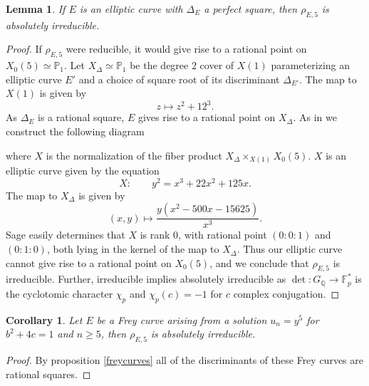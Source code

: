 \documentclass[12pt]{amsart}
\newtheorem{lem}[thm]{Lemma}
\newtheorem{cor}[thm]{Corollary}
\theoremstyle{definition}
\def\F{{\mathbb F}}
\def\P{{{\mathbb P}}}
\def\Q{{\mathbb Q}}
\begin{document}
\begin{lem}\label{5irr}
If $E$ is an elliptic curve with $\Delta_E$ a perfect square, then $\rho_{E,5} $ is absolutely irreducible.
\end{lem}
\begin{proof}
If $\rho_{E,5}$ were reducible, it would give rise to a rational point on $X_0(5) \simeq \P_1$.  Let $X_{\Delta} \simeq \P_1$ be the degree $2$ cover of $X(1)$ parameterizing an elliptic curve $E'$ and a choice of square root of its discriminant $\Delta_{E'}$.  The map to $X(1)$ is given by
\[z \mapsto z^2 + 12^3. \]
As $\Delta_E$ is a rational square, $E$ gives rise to a rational point on $X_{\Delta}$.
As in \cite{brown12} we construct the following diagram
\begin{center}
\end{center}
where $X$ is the normalization of the fiber product $X_{\Delta} \times_{X(1)} X_0(5)$.  $X$ is an elliptic curve given by the equation
\[X: \qquad  y^2 = x^3 + 22x^2 +125x .\]
The map to $X_{\Delta}$ is given by
\[ (x,y) \mapsto \frac{y(x^2-500x -15625)}{x^3}. \]
Sage easily determines that $X$ is rank $0$, with rational point $(0:0:1)$ and $(0:1:0)$, both lying in the kernel of the map to $X_{\Delta}$.  Thus our elliptic curve cannot give rise to a rational point on $X_0(5)$, and we conclude that $\rho_{E,5}$ is irreducible.  Further, irreducible implies absolutely irreducible as $\det: G_\Q \rightarrow \F_p^*$ is the cyclotomic character $\chi_p$ and $\chi_p(c)=-1$ for $c$ complex conjugation.
\end{proof}
\begin{cor}\label{frey5irr}
Let $E$ be a Frey curve arising from a solution $u_n = y^5$ for $b^2+4c = 1$ and $n\geq 5$, then $\rho_{E,5}$ is absolutely irreducible.
\end{cor}
\begin{proof}
By proposition \ref{freycurves} all of the discriminants of these Frey curves are rational squares.
\end{proof}
\end{document}
